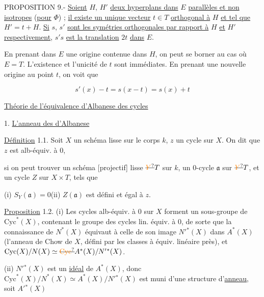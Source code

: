 \margin{\handwritten{\unsure{/}}}

\margin{\handwritten{\unsure{!}}}

PROPOSITION 9.- \uline{Soient} $H$, $H'$ \uline{deux hyperplans dans} $E$ \uline{parallèles et non isotropes} (\uline{pour} $\Phi$) ; \uline{il existe un unique vecteur} $t\in T$ \uline{orthogonal à} $H$ \uline{et tel que} $H'=t+H$. \uline{Si} $s$, $s'$ \uline{sont les symétries orthogonales par rapport à} $H$ \uline{et} $H'$ \uline{respectivement}, $s's$ \uline{est la translation} $2t$ \uline{dans} $E$.

En prenant dans $E$ une origine contenue dans $H$, on peut se borner au cas où $E=T$. L'existence et l'unicité de $t$ sont immédiates. En prenant une nouvelle origine au point $t$, on voit que

\[
s'(x)-t=s(x-t)=s(x)+t
\]


\uline{Théorie de l'équivalence d'Albanese des cycles}

1. \uline{L'anneau des  d'Albanese}

\uline{Définition} 1.1. Soit $X$ un schéma \deleted{[projectif]} lisse sur le corps $k$, $z$ un cycle sur $X$. On dit que $z$ est alb-équiv. à $0$,


si on peut trouver un schéma [projectif] lisse  $\deleted{\unsure{Y}}T$ sur $k$,  un $0$-cycle  $\mathfrak a$ sur $\deleted{\unsure{Y}}T$, et un cycle $Z$ sur $X\times T$, tels que

(i)  $S_Y(\mathfrak a)=0$\qquad (ii) $Z(\mathfrak a)$ est défini et égal à $z$.

\uline{Proposition} 1.2. (i) Les cycles alb-équiv. à $0$ sur $X$ forment un sous-groupe  de $\mathrm{Cyc}^*(X)$, contenant le groupe des cycles lin. équiv. à $0$, de sorte que la connaissance de $N^*(X)$ équivaut à celle de son image $N'{}^*(X)$ dans  $A^*(X)$ (l'anneau de Chow de $X$, défini par les classes à équiv. linéaire près), et $\mathrm{Cyc}(X)/N(X)\simeq\deleted{\unsure{\mathrm{Cyc}}}A^*(X)/N'{}^*(X)$.

(ii) $N'{}^*(X)$ est un \uline{idéal} de $A^*(X)$, donc $\mathrm{Cyc}^*(X)/N^*(X)\simeq A^*(X)/N'{}^*(X)$ est muni d'une structure d'\uline{anneau}, soit $A'{}^*(X)$

